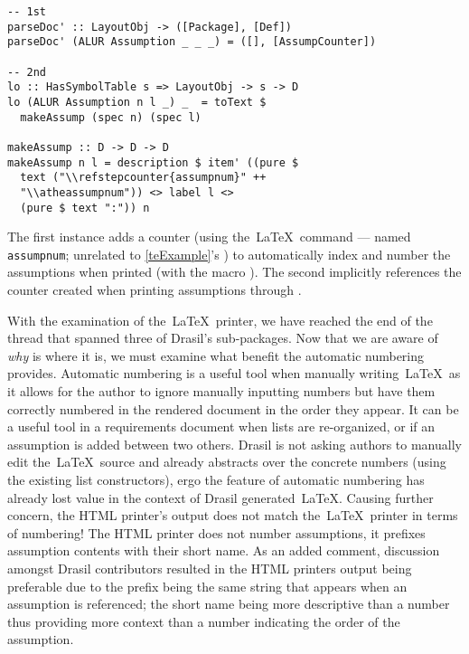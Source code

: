 \begin{tcolorbox}
\begin{verbatim}
-- 1st
parseDoc' :: LayoutObj -> ([Package], [Def])
parseDoc' (ALUR Assumption _ _ _) = ([], [AssumpCounter])

-- 2nd
lo :: HasSymbolTable s => LayoutObj -> s -> D
lo (ALUR Assumption n l _) _  = toText $
  makeAssump (spec n) (spec l)

makeAssump :: D -> D -> D
makeAssump n l = description $ item' ((pure $
  text ("\\refstepcounter{assumpnum}" ++
  "\\atheassumpnum")) <> label l <>
  (pure $ text ":")) n
\end{verbatim}
\end{tcolorbox}

The first instance adds a counter (using the\ \LaTeX\ command \texttt{\newcounter} --- named \texttt{assumpnum}; unrelated to \autoref{teExample}'s ) to automatically index and number the assumptions when printed (with the macro \texttt{\atheassumpnum}). The second implicitly references the counter created when printing assumptions through .

With the examination of the\ \LaTeX\ printer, we have reached the end of the thread that spanned three of Drasil's sub-packages. Now that we are aware of \textit{why}  is where it is, we must examine what benefit the automatic numbering provides. Automatic numbering is a useful tool when manually writing\ \LaTeX\ as it allows for the author to ignore manually inputting numbers but have them correctly numbered in the rendered document in the order they appear. It can be a useful tool in a requirements document when lists are re-organized, or if an assumption is added between two others. Drasil is not asking authors to manually edit the\ \LaTeX\ source and already abstracts over the concrete numbers (using the existing list constructors), ergo the feature of automatic numbering has already lost value in the context of Drasil generated\ \LaTeX. Causing further concern, the HTML printer's output does not match the\ \LaTeX\ printer in terms of numbering! The HTML printer does not number assumptions, it prefixes assumption contents with their short name. As an added comment, discussion amongst Drasil contributors resulted in the HTML printers output being preferable due to the prefix being the same string that appears when an assumption is referenced; the short name being more descriptive than a number thus providing more context than a number indicating the order of the assumption.

